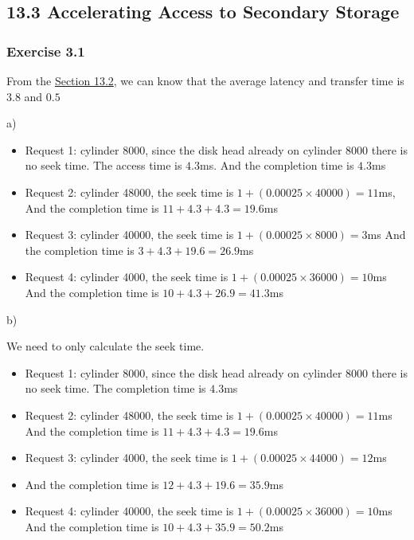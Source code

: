 \documentclass[../../main.tex]{subfiles}
\begin{document}
\subsection*{13.3 Accelerating Access to Secondary Storage}

\subsubsection*{Exercise 3.1}

From the \hyperlink{Section13.2}{Section 13.2}, we can know that the average latency
and transfer time is $3.8$ and $0.5$

a)

\begin{itemize}
  \item Request 1: cylinder 8000, since the disk head already on cylinder 8000 there
        is no seek time. The access time is $4.3$ms. And the completion time is $4.3$ms
  \item Request 2: cylinder 48000, the seek time is $ 1 + (0.00025 \times 40000) = 11$ms,
        And the completion time is $11 + 4.3 + 4.3 = 19.6$ms
  \item Request 3: cylinder 40000, the seek time is $ 1 + (0.00025 \times 8000) = 3$ms
        And the completion time is $3 + 4.3 + 19.6 = 26.9$ms
  \item Request 4: cylinder 4000, the seek time is $1 + (0.00025 \times 36000) = 10$ms
        And the completion time is $10 + 4.3 + 26.9 = 41.3$ms
\end{itemize}

b)

We need to only calculate the seek time.

\begin{itemize}
  \item Request 1: cylinder 8000, since the disk head already on cylinder 8000 there
        is no seek time. The completion time is $4.3$ms
  \item Request 2: cylinder 48000, the seek time is $ 1 + (0.00025 \times 40000) = 11$ms
        And the completion time is $11 + 4.3 + 4.3 = 19.6$ms
  \item Request 3: cylinder 4000, the seek time is $ 1 + (0.00025 \times 44000) = 12$ms
  \item And the completion time is $12 + 4.3 + 19.6 = 35.9$ms
  \item Request 4: cylinder 40000, the seek time is $1 + (0.00025 \times 36000) = 10$ms
        And the completion time is $10 + 4.3 + 35.9 = 50.2$ms
\end{itemize}
\end{document}
